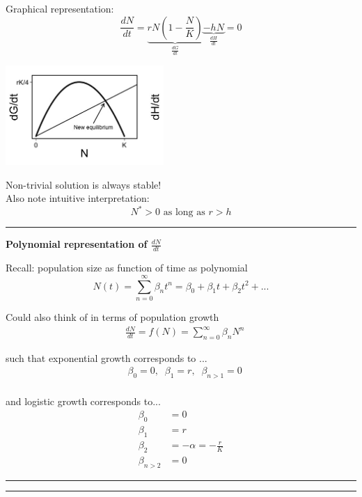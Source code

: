 \documentclass{article}
\begin{document}
Graphical representation:\\
\begin{equation*}
\frac{dN}{dt}=\underbrace{rN\left(1-\frac{N}{K}\right)}_{\frac{dG}{dt}}\underbrace{-hN}_{\frac{dH}{dt}}=0
\end{equation*}
\begin{center}
\includegraphics[width=6cm]{figs/dNdt_harvesteffort.jpeg}
\end{center}
Non-trivial solution is always stable!\\
Also note intuitive interpretation:\\
\begin{equation*}
	N^*>0 \text{ as long as } r>h
\end{equation*}

\rule[0.5ex]{\linewidth}{1pt}


\textbf{Polynomial representation of $\frac{dN}{dt}$}

Recall: population size as function of time as polynomial
\begin{equation*}
	N(t)=\sum_{n=0}^\infty \beta_n t^n = \beta_0 + \beta_1 t + \beta_2 t^2 +...
\end{equation*}


Could also think of in terms of population growth 
\begin{align*}
&	\frac{dN}{dt}=f(N)=\sum_{n=0}^\infty \beta_n N^n
\end{align*}

such that exponential growth corresponds to ...
\begin{align*}
& 	\beta_0=0, \;\; \beta_1 = r, \;\; \beta_{n>1}=0\\
\end{align*}

and logistic growth corresponds to...
\begin{align*}
	\beta_0 &= 0\\
	\beta_1 &= r\\
	\beta_2 &= -\alpha = -\frac{r}{K}\\
	\beta_{n>2} & =0
\end{align*}

\rule[0.5ex]{\linewidth}{1pt}
\rule[0.5ex]{\linewidth}{1pt}
\end{document}
